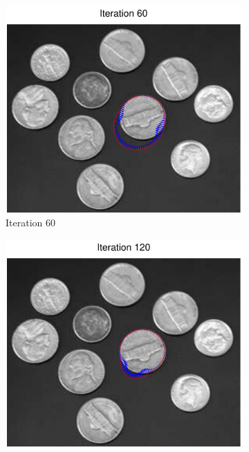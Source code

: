 \documentclass[11pt,a4paper]{article}
\begin{document}
\begin{figure}[H]
\begin{subfigure}[t]{0.24\textwidth}
        \label{fig:coins_0}
    \end{subfigure}
    \begin{subfigure}[t]{0.24\textwidth}
        \includegraphics[width=\textwidth]{src/images/coins_gradient_60.pdf}
        \caption{Iteration 60}
        \label{fig:coins_60}
    \end{subfigure}
    \begin{subfigure}[t]{0.24\textwidth}
        \includegraphics[width=\textwidth]{src/images/coins_gradient_120.pdf}

\end{subfigure}
\end{figure}
\end{document}
